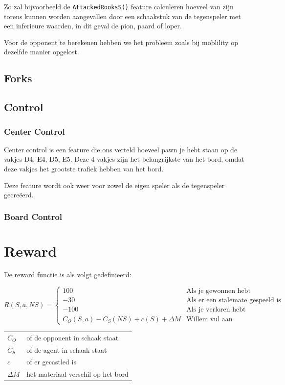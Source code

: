 \documentclass[a4paper,openany]{uantwerpenassignment}
\makeatletter
\newenvironment{conditions}
  {\par\vspace{\abovedisplayskip}\noindent\begin{tabular}{>{$}l<{$} @{${}={}$} l}}
  {\end{tabular}\par\vspace{\belowdisplayskip}}
\newcommand{\codeword}[1]{
    \colorbox{code}{\texttt{\textcolor{codetext}{#1}}}
}
\makeatother
\begin{document}
Zo zal bijvoorbeeld de \codeword{AttackedRooksS()} feature calculeren hoeveel van zijn torens kunnen worden aangevallen door een schaakstuk van de tegenspeler met een inferieure waarden, in dit geval de pion, paard of loper.

Voor de opponent te berekenen hebben we het probleem zoals bij moblility op dezelfde manier opgelost.

\subsection{Forks}
\subsection{Control}
\subsubsection{Center Control}
Center control is een feature die ons verteld hoeveel pawn je hebt staan op de vakjes D4, E4, D5, E5. Deze 4 vakjes zijn het belangrijkste van het bord, omdat deze vakjes het grootste trafiek hebben van het bord.

Deze feature wordt ook weer voor zowel de eigen speler als de tegenspeler gecreëerd.

\subsubsection{Board Control}

\section{Reward}

De reward functie is als volgt gedefinieerd:


$$
R(S, a, NS) = 
\begin{cases}
    100 &\mbox{Als je gewonnen hebt}\\
    -30 &\mbox{Als er een stalemate gespeeld is}\\
    -100 &\mbox{Als je verloren hebt}\\
     C_O(S, a) - C_S(NS) + c(S) + \Delta M &\mbox{Willem vul aan}
\end{cases}
$$



\begin{conditions}
    C_O & of de opponent in schaak staat\\
    C_S & of de agent in schaak staat\\
    c &   of er gecastled is\\
    \Delta M & het materiaal verschil op het bord
\end{conditions}
\end{document}
